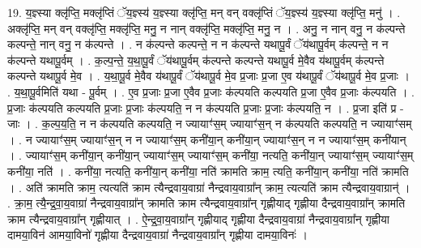 \documentclass[17pt]{extarticle}
\begin{document}
19. य॒ज्ञ्स्या क्लृ॑प्ति॒ मक्लृ॑प्तिं ॅय॒ज्ञ्स्य॑ य॒ज्ञ्स्या क्लृ॑प्ति॒ मन् वन् वक्लृ॑प्तिं ॅय॒ज्ञ्स्य॑ य॒ज्ञ्स्या क्लृ॑प्ति॒ मनु॑ । . अक्लृ॑प्ति॒ मन् वन् वक्लृ॑प्ति॒ मक्लृ॑प्ति॒ मनु॒ न नान् वक्लृ॑प्ति॒ मक्लृ॑प्ति॒ मनु॒ न । . अनु॒ न नान् वनु॒ न क॑ल्पन्ते कल्पन्ते॒ नान् वनु॒ न क॑ल्पन्ते । . न क॑ल्पन्ते कल्पन्ते॒ न न क॑ल्पन्ते यथापू॒र्वं ॅय॑थापू॒र्वम् क॑ल्पन्ते॒ न न क॑ल्पन्ते यथापू॒र्वम् । . क॒ल्प॒न्ते॒ य॒था॒पू॒र्वं ॅय॑थापू॒र्वम् क॑ल्पन्ते कल्पन्ते यथापू॒र्व मे॒वैव य॑थापू॒र्वम् क॑ल्पन्ते कल्पन्ते यथापू॒र्व मे॒व । . य॒था॒पू॒र्व मे॒वैव य॑थापू॒र्वं ॅय॑थापू॒र्व मे॒व प्र॒जाः प्र॒जा ए॒व य॑थापू॒र्वं ॅय॑थापू॒र्व मे॒व प्र॒जाः । . य॒था॒पू॒र्वमिति॑ यथा - पू॒र्वम् । . ए॒व प्र॒जाः प्र॒जा ए॒वैव प्र॒जाः क॑ल्पयति कल्पयति प्र॒जा ए॒वैव प्र॒जाः क॑ल्पयति । . प्र॒जाः क॑ल्पयति कल्पयति प्र॒जाः प्र॒जाः क॑ल्पयति॒ न न क॑ल्पयति प्र॒जाः प्र॒जाः क॑ल्पयति॒ न । . प्र॒जा इति॑ प्र - जाः । . क॒ल्प॒य॒ति॒ न न क॑ल्पयति कल्पयति॒ न ज्यायाꣳ॑स॒म् ज्यायाꣳ॑स॒न् न क॑ल्पयति कल्पयति॒ न ज्यायाꣳ॑सम् । . न ज्यायाꣳ॑स॒म् ज्यायाꣳ॑स॒न् न न ज्यायाꣳ॑स॒म् कनी॑या॒न् कनी॑या॒न् ज्यायाꣳ॑स॒न् न न ज्यायाꣳ॑स॒म् कनी॑यान् । . ज्यायाꣳ॑स॒म् कनी॑या॒न् कनी॑या॒न् ज्यायाꣳ॑स॒म् ज्यायाꣳ॑स॒म् कनी॑या॒ नत्यति॒ कनी॑या॒न् ज्यायाꣳ॑स॒म् ज्यायाꣳ॑स॒म् कनी॑या॒ नति॑ । . कनी॑या॒ नत्यति॒ कनी॑या॒न् कनी॑या॒ नति॑ क्रामति क्राम॒ त्यति॒ कनी॑या॒न् कनी॑या॒ नति॑ क्रामति । . अति॑ क्रामति क्राम॒ त्यत्यति॑ क्राम त्यैन्द्रवाय॒वाग्रा॑ नैन्द्रवाय॒वाग्रा᳚न् क्राम॒ त्यत्यति॑ क्राम त्यैन्द्रवाय॒वाग्रान्॑ । . क्रा॒म॒ त्यै॒न्द्र॒वा॒य॒वाग्रा॑ नैन्द्रवाय॒वाग्रा᳚न् क्रामति क्राम त्यैन्द्रवाय॒वाग्रा᳚न् गृह्णीयाद् गृह्णीया दैन्द्रवाय॒वाग्रा᳚न् क्रामति क्राम त्यैन्द्रवाय॒वाग्रा᳚न् गृह्णीयात् । . ऐ॒न्द्र॒वा॒य॒वाग्रा᳚न् गृह्णीयाद् गृह्णीया दैन्द्रवाय॒वाग्रा॑ नैन्द्रवाय॒वाग्रा᳚न् गृह्णीया दामया॒विन॑ आमया॒विनो॑ गृह्णीया दैन्द्रवाय॒वाग्रा॑ नैन्द्रवाय॒वाग्रा᳚न् गृह्णीया दामया॒विनः॑ । \newline
\end{document}
